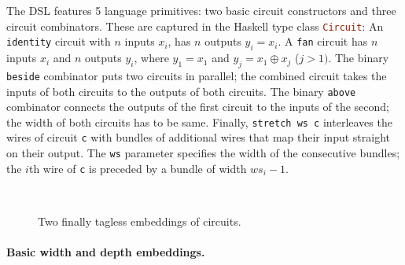 The DSL features 5 language primitives: two basic circuit constructors and
three circuit combinators. These are captured in the Haskell type class \lstinline[language=haskell]{Circuit}:
An \lstinline[language=haskell]{identity} circuit with $n$ inputs $x_i$,  has
$n$ outputs $y_i = x_i$. A \lstinline[language=haskell]{fan} circuit has $n$ inputs $x_i$ and $n$
outputs $y_i$, where $y_1 = x_1$ and $y_j = x_1 \oplus x_j$ ($j > 1)$.
The binary \lstinline[language=haskell]{beside} combinator puts two circuits in parallel; the combined circuit
takes the inputs of both circuits to the outputs of both circuits.
The binary \lstinline[language=haskell]{above} combinator connects the outputs of the first circuit to
the inputs of the second; the width of both circuits has to be same.
Finally,
\lstinline[language=haskell]{stretch ws c} interleaves the wires of circuit \lstinline[language=haskell]{c} with
bundles of additional wires that map their input straight on their output.
The \lstinline[language=haskell]{ws} parameter specifies the width of the consecutive bundles;
the $i$th wire of \lstinline[language=haskell]{c} is preceded by a bundle of width $\textit{ws}_i - 1$.


\begin{figure}[t]
  \begin{subfigure}[b]{0.44\textwidth}
  \end{subfigure} ~
  \begin{subfigure}[b]{0.57\textwidth}
  \end{subfigure}
  \caption{Two finally tagless embeddings of circuits.}\label{fig:finally-tagless}
\end{figure}


\paragraph{Basic width and depth embeddings.}

